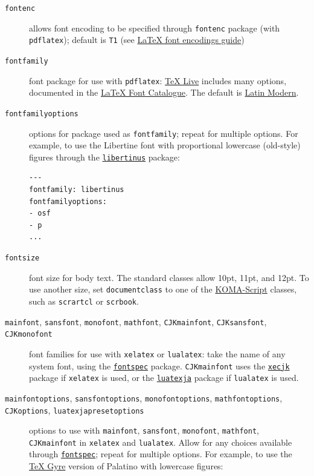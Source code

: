 \documentclass[
  b5paper
]{book}
\begin{document}
\begin{description}
\item[\texttt{fontenc}]
allows font encoding to be specified through \texttt{fontenc} package
(with \texttt{pdflatex}); default is \texttt{T1} (see
\href{https://ctan.org/pkg/encguide}{LaTeX font encodings guide})
\item[\texttt{fontfamily}]
font package for use with \texttt{pdflatex}:
\href{https://www.tug.org/texlive/}{TeX Live} includes many options,
documented in the \href{https://tug.org/FontCatalogue/}{LaTeX Font
Catalogue}. The default is \href{https://ctan.org/pkg/lm}{Latin Modern}.
\item[\texttt{fontfamilyoptions}]
options for package used as \texttt{fontfamily}; repeat for multiple
options. For example, to use the Libertine font with proportional
lowercase (old-style) figures through the
\href{https://ctan.org/pkg/libertinus}{\texttt{libertinus}} package:

\begin{verbatim}
---
fontfamily: libertinus
fontfamilyoptions:
- osf
- p
...
\end{verbatim}
\item[\texttt{fontsize}]
font size for body text. The standard classes allow 10pt, 11pt, and
12pt. To use another size, set \texttt{documentclass} to one of the
\href{https://ctan.org/pkg/koma-script}{KOMA-Script} classes, such as
\texttt{scrartcl} or \texttt{scrbook}.
\item[\texttt{mainfont}, \texttt{sansfont}, \texttt{monofont},
\texttt{mathfont}, \texttt{CJKmainfont}, \texttt{CJKsansfont},
\texttt{CJKmonofont}]
font families for use with \texttt{xelatex} or \texttt{lualatex}: take
the name of any system font, using the
\href{https://ctan.org/pkg/fontspec}{\texttt{fontspec}} package.
\texttt{CJKmainfont} uses the
\href{https://ctan.org/pkg/xecjk}{\texttt{xecjk}} package if
\texttt{xelatex} is used, or the
\href{https://ctan.org/pkg/luatexja}{\texttt{luatexja}} package if
\texttt{lualatex} is used.
\item[\texttt{mainfontoptions}, \texttt{sansfontoptions},
\texttt{monofontoptions}, \texttt{mathfontoptions}, \texttt{CJKoptions},
\texttt{luatexjapresetoptions}]
options to use with \texttt{mainfont}, \texttt{sansfont},
\texttt{monofont}, \texttt{mathfont}, \texttt{CJKmainfont} in
\texttt{xelatex} and \texttt{lualatex}. Allow for any choices available
through \href{https://ctan.org/pkg/fontspec}{\texttt{fontspec}}; repeat
for multiple options. For example, to use the
\href{http://www.gust.org.pl/projects/e-foundry/tex-gyre}{TeX Gyre}
version of Palatino with lowercase figures:


\end{description}
\end{document}
